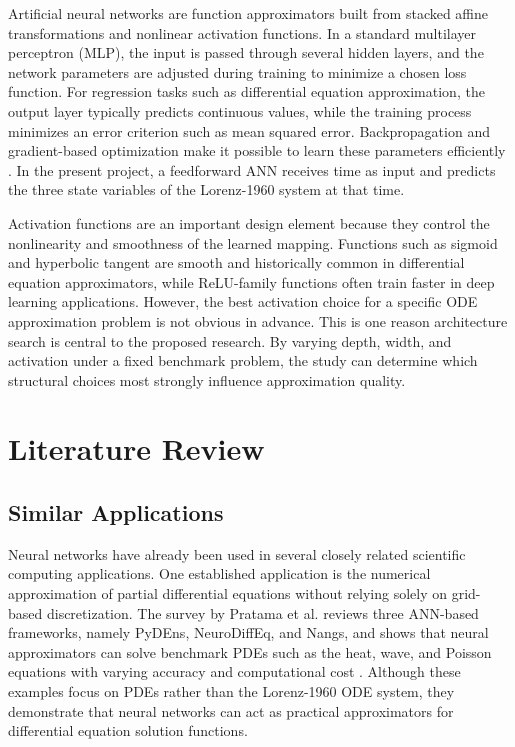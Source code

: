 Artificial neural networks are function approximators built from stacked affine transformations and nonlinear activation functions. In a standard multilayer perceptron (MLP), the input is passed through several hidden layers, and the network parameters are adjusted during training to minimize a chosen loss function. For regression tasks such as differential equation approximation, the output layer typically predicts continuous values, while the training process minimizes an error criterion such as mean squared error. Backpropagation and gradient-based optimization make it possible to learn these parameters efficiently \cite{pratama2022ann,chen2019neural}. In the present project, a feedforward ANN receives time as input and predicts the three state variables of the Lorenz-1960 system at that time.

Activation functions are an important design element because they control the nonlinearity and smoothness of the learned mapping. Functions such as sigmoid and hyperbolic tangent are smooth and historically common in differential equation approximators, while ReLU-family functions often train faster in deep learning applications. However, the best activation choice for a specific ODE approximation problem is not obvious in advance. This is one reason architecture search is central to the proposed research. By varying depth, width, and activation under a fixed benchmark problem, the study can determine which structural choices most strongly influence approximation quality.

\section{Literature Review}
\subsection{Similar Applications}
Neural networks have already been used in several closely related scientific computing applications. One established application is the numerical approximation of partial differential equations without relying solely on grid-based discretization. The survey by Pratama et al. reviews three ANN-based frameworks, namely PyDEns, NeuroDiffEq, and Nangs, and shows that neural approximators can solve benchmark PDEs such as the heat, wave, and Poisson equations with varying accuracy and computational cost \cite{pratama2022ann}. Although these examples focus on PDEs rather than the Lorenz-1960 ODE system, they demonstrate that neural networks can act as practical approximators for differential equation solution functions.

